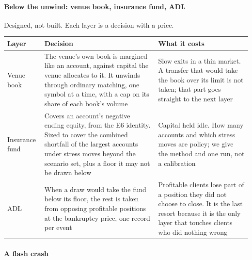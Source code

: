 \documentclass[10pt,a4paper]{article}
\newcounter{none}  %
\begin{document}
\paragraph{Below the unwind: venue book, insurance fund, ADL}\label{below-the-unwind-venue-book-insurance-fund-adl}

Designed, not built. Each layer is a decision with a price.

{\def\LTcaptype{none} %
\begin{longtable}[]{@{}
  >{\raggedright\arraybackslash}p{}
  >{\raggedright\arraybackslash}p{}
  >{\raggedright\arraybackslash}p{}@{}}
\toprule\noalign{}
\begin{minipage}[b]{\linewidth}\raggedright
Layer
\end{minipage} & \begin{minipage}[b]{\linewidth}\raggedright
Decision
\end{minipage} & \begin{minipage}[b]{\linewidth}\raggedright
What it costs
\end{minipage} \\
\midrule\noalign{}
\endhead
\bottomrule\noalign{}
\endlastfoot
Venue book & The venue's own book is margined like an account, against capital the venue allocates to it. It unwinds through ordinary matching, one symbol at a time, with a cap on its share of each book's volume & Slow exits in a thin market. A transfer that would take the book over its limit is not taken; that part goes straight to the next layer \\
Insurance fund & Covers an account's negative ending equity, from the E6 identity. Sized to cover the combined shortfall of the largest accounts under stress moves beyond the scenario set, plus a floor it may not be drawn below & Capital held idle. How many accounts and which stress moves are policy; we give the method and one run, not a calibration \\
ADL & When a draw would take the fund below its floor, the rest is taken from opposing profitable positions at the bankruptcy price, one record per event & Profitable clients lose part of a position they did not choose to close. It is the last resort because it is the only layer that touches clients who did nothing wrong \\
\end{longtable}
}

\paragraph{A flash crash}\label{a-flash-crash}
\end{document}

